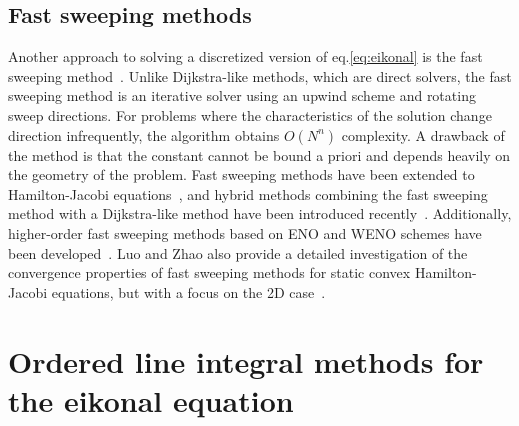 \documentclass[smallcondensed]{svjour3}
\begin{document}
\subsection{Fast sweeping methods} Another approach to solving a
discretized version of eq.\@ \ref{eq:eikonal} is the fast sweeping
method~\cite{tsai2003fast,zhao2005fast}. Unlike Dijkstra-like methods,
which are direct solvers, the fast sweeping method is an iterative
solver using an upwind scheme and rotating sweep directions. For
problems where the characteristics of the solution change direction
infrequently, the algorithm obtains $O(N^n)$ complexity. A drawback of
the method is that the constant cannot be bound a priori and depends
heavily on the geometry of the problem. Fast sweeping methods have
been extended to Hamilton-Jacobi
equations~\cite{tsai2003fast,kao2008legendre}, and hybrid methods
combining the fast sweeping method with a Dijkstra-like method have
been introduced
recently~\cite{chacon2012fast,chacon2015parallel}. Additionally,
higher-order fast sweeping methods based on ENO and WENO schemes have
been developed~\cite{zhang2006high}. Luo and Zhao also provide a
detailed investigation of the convergence properties of fast sweeping
methods for static convex Hamilton-Jacobi equations, but with a focus
on the 2D case~\cite{luo2016convergence}.

\section{Ordered line integral methods for the eikonal equation}\label{sec:olim}
\end{document}
